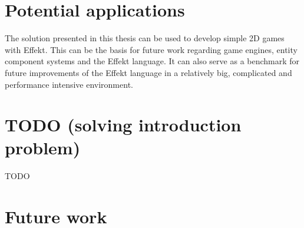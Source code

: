 \label{chap:conclusion}

\section*{Potential applications}

The solution presented in this thesis can be used to develop simple 2D games with Effekt. This can be the basis for future work regarding game engines, entity component systems and the Effekt language. It can also serve as a benchmark for future improvements of the Effekt language in a relatively big, complicated and performance intensive environment.

\section*{TODO (solving introduction problem)}

TODO

\section*{Future work}


